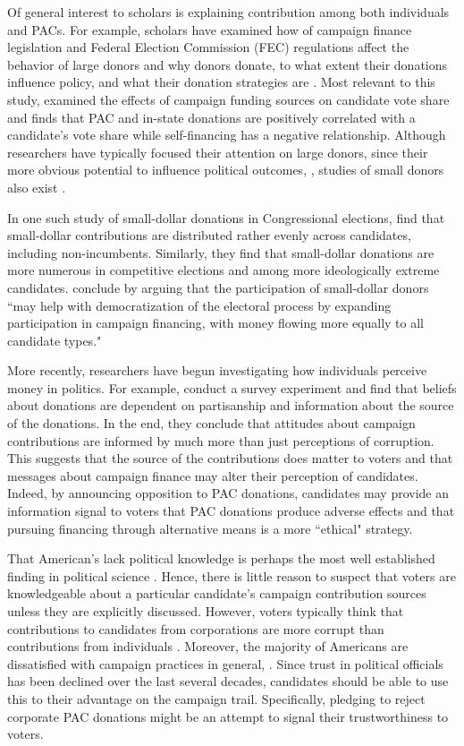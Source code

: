 \documentclass[12pt]{article}
\begin{document}
 Of general interest to scholars is explaining contribution among both individuals and PACs.  For example, scholars have examined how of campaign finance legislation and Federal Election Commission (FEC) regulations affect the behavior of large donors \citep{magleby2010, raja2008} and why donors donate, to what extent their donations influence policy, and what their donation strategies are \citep{francia2003}. Most relevant to this study, \citet{alexander2005} examined the effects of campaign funding sources on candidate vote share and finds that PAC and in-state donations are positively correlated with a candidate's vote share while self-financing has a negative relationship. Although researchers have typically focused their attention on large donors, since their more obvious potential to influence political outcomes, \citep{barber2017, francia2003}, studies of small donors also exist \citep{johnson2010, lipsitz2011}.  
 
 In one such study of small-dollar donations in Congressional elections, \citet{culberson2019} find that small-dollar contributions are distributed rather evenly across candidates, including non-incumbents. Similarly, they find that small-dollar donations are more numerous in competitive elections and among more ideologically extreme candidates. \citet{culberson2019} conclude by arguing that the participation of small-dollar donors ``may help with democratization of the electoral process by expanding participation in campaign financing, with money flowing more equally to all candidate types."   
 
 More recently, researchers have begun investigating how individuals perceive money in politics. For example, \citet{bowler2016} conduct a survey experiment and find that beliefs about donations are dependent on partisanship and information about the source of the donations. In the end, they conclude that attitudes about campaign contributions are informed by much more than just perceptions of corruption. This suggests that the source of the contributions does matter to voters and that messages about campaign finance may alter their perception of candidates. Indeed, by announcing opposition to PAC donations, candidates may provide an information signal to voters that PAC donations produce adverse effects and that pursuing financing through alternative means is a more ``ethical" strategy. 
 
 That American's lack political knowledge is perhaps the most well established finding in political science \citep{page1992, carpini1997}. Hence, there is little reason to suspect that voters are knowledgeable about a particular candidate's campaign contribution sources unless they are explicitly discussed. However, voters typically think that contributions to candidates from corporations are more corrupt than contributions from individuals \citep{bowler2016}. Moreover, the majority of Americans are dissatisfied with campaign practices in general, \citep{mayer2001, persily2004}. Since trust in political officials has been declined over the last several decades, candidates should be able to use this to their advantage on the campaign trail. Specifically, pledging to reject corporate PAC donations might be an attempt to signal their trustworthiness to voters. 
 
\end{document}
